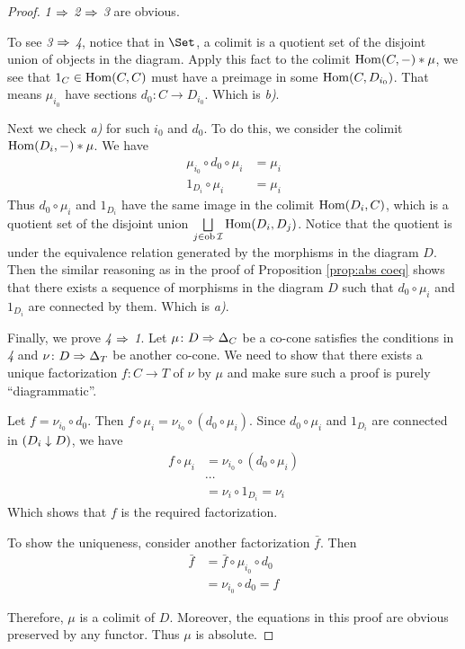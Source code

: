   \begin{proof}
    \emph{1 $\Rightarrow$ 2 $\Rightarrow$ 3} are obvious.

    To see \emph{3 $\Rightarrow$ 4}, notice that in $\Set$, a colimit is a quotient set of the disjoint union of objects in the diagram. Apply this fact to the colimit $\operatorname{Hom}(C,-)\ast\mu$, we see that $1_C\in\operatorname{Hom}(C,C)$ must have a preimage in some $\operatorname{Hom}(C,D_{i_0})$. That means $\mu_{i_0}$ have sections $d_0\colon C\to D_{i_0}$. Which is \emph{b)}.

    Next we check \emph{a)} for such $i_0$ and $d_0$. To do this, we consider the colimit $\operatorname{Hom}(D_i,-)\ast\mu$. We have
    \begin{align*}
      \mu_{i_0}\circ d_0\circ \mu_i & = \mu_i \\
      1_{D_i}\circ \mu_i & = \mu_i
    \end{align*}
    Thus $d_0 \circ \mu_i$ and $1_{D_i}$ have the same image in the colimit $\operatorname{Hom}(D_i,C)$, which is a quotient set of the disjoint union $\bigsqcup\limits_{j\in\operatorname{ob}{\cal I}}\operatorname{Hom}(D_i,D_j)$. Notice that the quotient is under the equivalence relation generated by the morphisms in the diagram $D$. Then the similar reasoning as in the proof of Proposition \ref{prop:abs coeq} shows that there exists a sequence of morphisms in the diagram $D$ such that $d_0 \circ \mu_i$ and $1_{D_i}$ are connected by them. Which is \emph{a)}.

    Finally, we prove \emph{4 $\Rightarrow$ 1}. Let $\mu\colon D\Rightarrow\Delta_C$ be a co-cone satisfies the conditions in \emph{4} and $\nu\colon D\Rightarrow\Delta_T$ be another co-cone. We need to show that there exists a unique factorization $f\colon C\to T$ of $\nu$ by $\mu$ and make sure such a proof is purely ``diagrammatic''.

    Let $f=\nu_{i_0}\circ d_0$. Then $f\circ \mu_i = \nu_{i_0} \circ (d_0 \circ \mu_i)$. Since $d_0 \circ \mu_i$ and $1_{D_i}$ are connected in $(D_i \downarrow D)$, we have
    \begin{align*}
      f\circ \mu_i & = \nu_{i_0} \circ (d_0 \circ \mu_i) \\
      & \cdots \\
      & = \nu_i \circ 1_{D_i} = \nu_{i}
    \end{align*}
    Which shows that $f$ is the required factorization.

    To show the uniqueness, consider another factorization $\bar{f}$. Then
    \begin{align*}
      \bar{f} & = \bar{f} \circ \mu_{i_0} \circ d_0 \\
      & = \nu_{i_0} \circ d_0 = f
    \end{align*}

    Therefore, $\mu$ is a colimit of $D$. Moreover, the equations in this proof are obvious preserved by any functor. Thus $\mu$ is absolute.
  \end{proof}
